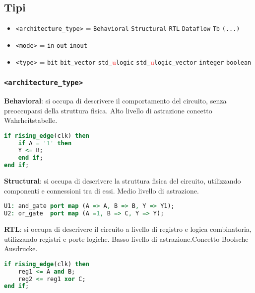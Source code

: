     \subsection{Tipi}
        \begin{itemize}
            \item \texttt{<architecture\_type>} = \texttt{Behavioral} \textbar{} \texttt{Structural} \textbar{} \texttt{RTL} \textbar{} \texttt{Dataflow} \textbar{} \texttt{Tb} \textbar{} \texttt{(...)} 
            \item \texttt{<mode>} = \texttt{in} \textbar{} \texttt{out} \textbar{} \texttt{inout}
            \item \texttt{<type>} = \texttt{bit} \textbar{} \texttt{bit\_vector} \textbar{} \texttt{std\_}\textcolor{red}{u}\texttt{logic} \textbar{} \texttt{std\_}\textcolor{red}{u}\texttt{logic\_vector} \textbar{} \texttt{integer} \textbar{} \texttt{boolean}
        \end{itemize}
        


        \subsubsection{\texttt{<architecture\_type>}}
            \textbf{Behavioral}: si occupa di descrivere il comportamento del circuito, senza preoccuparsi della struttura fisica. Alto livello di astrazione concetto Wahrheitstabelle.
            \begin{lstlisting}[language=VHDL]
if rising_edge(clk) then
    if A = '1' then
    Y <= B;
    end if;
end if;
            \end{lstlisting}

            \textbf{Structural}: si occupa di descrivere la struttura fisica del circuito, utilizzando componenti e connessioni tra di essi. Medio livello di astrazione.
            \begin{lstlisting}[language=VHDL]
U1: and_gate port map (A => A, B => B, Y => Y1);
U2: or_gate  port map (A =1, B => C, Y => Y);
            \end{lstlisting}

            \textbf{RTL}: si occupa di descrivere il circuito a livello di registro e logica combinatoria, utilizzando registri e porte logiche. Basso livello di astrazione.Concetto Boolsche Ausdrucke.
            \begin{lstlisting}[language=VHDL]
if rising_edge(clk) then
    reg1 <= A and B;
    reg2 <= reg1 xor C;
end if;
            \end{lstlisting}

